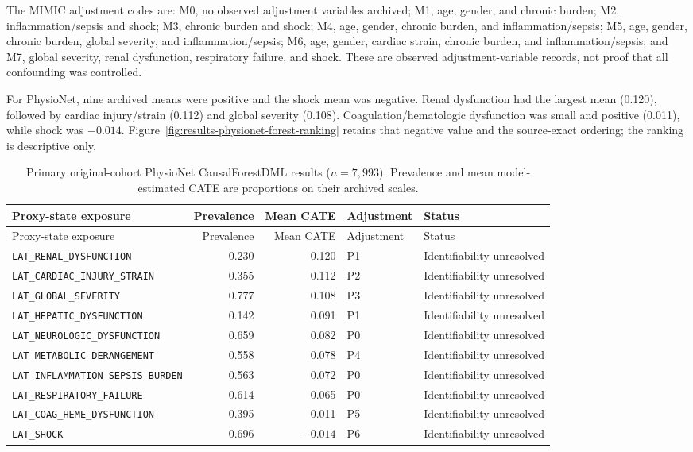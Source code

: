 The MIMIC adjustment codes are: M0, no observed adjustment variables archived; M1, age, gender, and chronic burden; M2, inflammation/sepsis and shock; M3, chronic burden and shock; M4, age, gender, chronic burden, and inflammation/sepsis; M5, age, gender, chronic burden, global severity, and inflammation/sepsis; M6, age, gender, cardiac strain, chronic burden, and inflammation/sepsis; and M7, global severity, renal dysfunction, respiratory failure, and shock.  These are observed adjustment-variable records, not proof that all confounding was controlled.

For PhysioNet, nine archived means were positive and the shock mean was negative.  Renal dysfunction had the largest mean (0.120), followed by cardiac injury/strain (0.112) and global severity (0.108).  Coagulation/hematologic dysfunction was small and positive (0.011), while shock was $-0.014$.  Figure~\ref{fig:results-physionet-forest-ranking} retains that negative value and the source-exact ordering; the ranking is descriptive only.

\begingroup
\footnotesize
\setlength{\tabcolsep}{4pt}
\begin{longtable}{@{}L{0.34\textwidth}rrlL{0.16\textwidth}@{}}
\caption[PhysioNet CausalForestDML results.]{Primary original-cohort PhysioNet CausalForestDML results ($n=7{,}993$).  Prevalence and mean model-estimated CATE are proportions on their archived scales.}
\label{tab:results-forest-physionet}\\
\toprule
Proxy-state exposure & Prevalence & Mean CATE & Adjustment & Status \\
\midrule
\endfirsthead
\toprule
Proxy-state exposure & Prevalence & Mean CATE & Adjustment & Status \\
\midrule
\endhead
\nolinkurl{LAT_RENAL_DYSFUNCTION} & 0.230 & 0.120 & P1 & Identifiability unresolved \\
\nolinkurl{LAT_CARDIAC_INJURY_STRAIN} & 0.355 & 0.112 & P2 & Identifiability unresolved \\
\nolinkurl{LAT_GLOBAL_SEVERITY} & 0.777 & 0.108 & P3 & Identifiability unresolved \\
\nolinkurl{LAT_HEPATIC_DYSFUNCTION} & 0.142 & 0.091 & P1 & Identifiability unresolved \\
\nolinkurl{LAT_NEUROLOGIC_DYSFUNCTION} & 0.659 & 0.082 & P0 & Identifiability unresolved \\
\nolinkurl{LAT_METABOLIC_DERANGEMENT} & 0.558 & 0.078 & P4 & Identifiability unresolved \\
\nolinkurl{LAT_INFLAMMATION_SEPSIS_BURDEN} & 0.563 & 0.072 & P0 & Identifiability unresolved \\
\nolinkurl{LAT_RESPIRATORY_FAILURE} & 0.614 & 0.065 & P0 & Identifiability unresolved \\
\nolinkurl{LAT_COAG_HEME_DYSFUNCTION} & 0.395 & 0.011 & P5 & Identifiability unresolved \\
\nolinkurl{LAT_SHOCK} & 0.696 & $-0.014$ & P6 & Identifiability unresolved \\
\bottomrule
\end{longtable}
\endgroup

